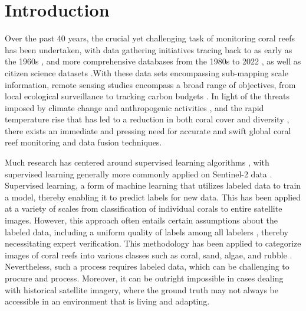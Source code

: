 \documentclass[journal,article,submit,pdftex,moreauthors]{Definitions/mdpi}
\begin{document}

\section{Introduction}

Over the past 40 years, the crucial yet challenging task of monitoring coral reefs has been undertaken, with data gathering initiatives tracing back to as early as the 1960s \cite{goreau1964mass}, and more comprehensive databases from the 1980s to 2022 \cite{Woesik2022},  as well as
citizen science datasets \cite{ALA2021}.With these data sets encompassing sub-mapping scale information, remote sensing studies encompass a broad range of objectives, from local ecological surveillance to tracking carbon budgets \cite{duarte2017reviews}. In light of the threats imposed 
by climate change and anthropogenic activities \cite{hughes2010rising}, 
and the rapid temperature rise that has led to a reduction in both coral cover and diversity \cite{bruno2007thermal} \cite{pandolfi2003global} \cite{hoegh2007coral}, there exists an immediate and pressing need for accurate and swift global coral reef monitoring and data fusion techniques.


Much research has centered around supervised learning algorithms \cite{su14106161} \cite{white2021coral} \cite{pavoni2022taglab} \cite{zeng2022spectral}, with supervised learning generally more commonly applied on Sentinel-2 data \cite{phiri2020sentinel}. 
Supervised learning, a form of machine learning that utilizes labeled data to train a model, thereby enabling it to predict labels for new data.
This has been applied at a variety of scales from classification of individual corals to entire satellite images. However, this approach often entails certain assumptions about the labeled data, including a uniform quality of labels among all labelers \cite{sheng2008get}, 
thereby necessitating expert verification. This methodology has been applied to categorize images of coral reefs into various classes such as coral, sand, algae, and rubble \cite{Li2020}. 
Nevertheless, such a process requires labeled data, which can be challenging to procure and process. Moreover, it can be outright impossible in cases dealing with historical satellite imagery, where the ground truth may not always be accessible in an environment that is living and adapting.
\end{document}
